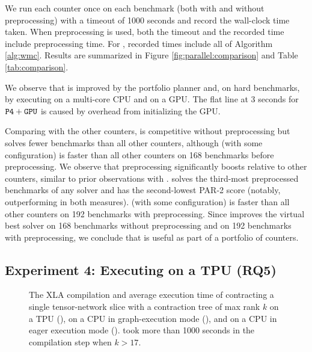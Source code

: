 We run each counter once on each benchmark (both with and without  preprocessing) with a timeout of 1000 seconds and record the wall-clock time taken. When preprocessing is used, both the timeout and the recorded time include preprocessing time. For , recorded times include all of Algorithm \ref{alg:wmc}. Results are summarized in Figure \ref{fig:parallel:comparison} and Table \ref{tab:comparison}. 

We observe that  is improved by the portfolio planner and, on hard benchmarks, by executing on a multi-core CPU and on a GPU. The flat line at 3 seconds for $\texttt{\upshape P4}+\texttt{\upshape GPU}$ is caused by overhead from initializing the GPU.

Comparing  with the other counters,  is competitive without preprocessing but solves fewer benchmarks than all other counters, although  (with some configuration) is faster than all other counters on 168 benchmarks before preprocessing. 
We observe that preprocessing significantly boosts  relative to other counters, similar to prior observations with  \cite{FHZ19}.  solves the third-most preprocessed benchmarks of any solver and has the second-lowest PAR-2 score (notably, outperforming  in both measures).  (with some configuration) is faster than all other counters on 192 benchmarks with preprocessing. Since  improves the virtual best solver on 168 benchmarks without preprocessing and on 192 benchmarks with preprocessing, we conclude that  is useful as part of a portfolio of counters.

\subsection{Experiment 4: Executing on a TPU (RQ5)}
\label{sec:parallel:exp:tpu}
\begin{figure}[t]
\begin{center}

%
\vspace*{-0.9cm}
\caption{\label{fig:parallel:tpu} The XLA compilation and average execution time of contracting a single tensor-network slice with a contraction tree of max rank $k$ on a TPU (), on a CPU in graph-execution mode (), and on a CPU in eager execution mode ().  took more than 1000 seconds in the compilation step when $k > 17$.}
\end{center}
\vspace*{-0.8cm}
\end{figure}

